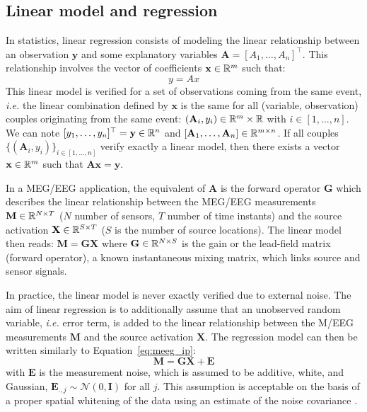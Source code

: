 \subsection{Linear model and regression}
In statistics, linear regression consists of modeling the linear relationship between an observation $\textbf{y}$ and some explanatory variables $\mathbf{A}=[A_1,\dots ,A_n]^\top$. This relationship involves the vector of coefficients $\mathbf{x}\in\mathbb{R}^m$ such that:
\begin{equation} \label{eq_linreg}
	y = Ax	
\end{equation}
This linear model is verified for a set of observations coming from the same event, \textit{i.e.} the linear combination defined by $\mathbf{x}$ is the same for all (variable, observation) couples originating from the same event: $(\mathbf{A}_i, y_i)\in\mathbb{R}^m\times\mathbb{R}$ with $i\in [1,\dots ,n]$. We can note $[y_1, \dots ,y_n]^\top=\mathbf{y}\in\mathbb{R}^n$ and $[\mathbf{A}_1,\dots ,\mathbf{A}_n]\in\mathbb{R}^{m\times n}$. If all couples $\{(\mathbf{A}_i,y_i)\}_{i\in [1,\dots ,n]}$ verify exactly a linear model, then there exists a vector $\mathbf{x}\in\mathbb{R}^m$ such that $\mathbf{Ax}=\textbf{y}$.

In a MEG/EEG application, the equivalent of $\mathbf{A}$ is the forward operator $\mathbf{G}$ which describes the linear relationship between the MEG/EEG measurements $\mathbf{M}\in\mathbb{R}^{N\times T}$ ($N$ number of sensors, $T$ number of time instants) and the source activation $\mathbf{X}\in\mathbb{R}^{S\times T}$ ($S$ is the number of source locations). The linear model then reads: $\mathbf{M} = \mathbf{GX}$ where $\mathbf{G}\in\mathbb{R}^{N\times S}$ is the gain or the lead-field matrix (forward operator), a known instantaneous mixing matrix, which links source and sensor signals. 

In practice, the linear model is never exactly verified due to external noise. The aim of linear regression is to additionally assume that an unobserved random variable, \textit{i.e.} error term, is added to the linear relationship between the M/EEG measurements $\mathbf{M}$ and the source activation $\mathbf{X}$. The regression model can then be written similarly to Equation~\eqref{eq:meeg_ip}:
\begin{equation} \label{eq_linmeeg}
	\mathbf{M} = \mathbf{GX} + \mathbf{E}
\end{equation}
with $\mathbf{E}$ is the measurement noise, which is assumed to be additive, white, and Gaussian, \mbox{$\mathbf{E}_{.,j}\sim\mathcal{N}(0,\mathbf{I})$} for all $j$. This assumption is acceptable on the basis of a proper spatial whitening of the data using an estimate of the noise covariance \cite{engemann2015automated}.

